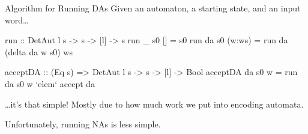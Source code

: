 \documentclass{beamer}
\begin{document}
  \begin{frame}[fragile]{Algorithm for Running DAs}
    Given an automaton, a starting state, and an input word\ldots

    \begin{code}
run :: DetAut l s -> s -> [l] -> s 
run _ s0 [] = s0 
run da s0 (w:ws) = run da (delta da w s0) ws 
 
acceptDA :: (Eq s) => DetAut l s -> s -> [l] -> Bool 
acceptDA da s0 w = run da s0 w `elem` accept da
    \end{code}\pause \vspace{1em}
    \ldots it's that simple! Mostly due to how much work we put into encoding automata. \vspace{1em} \pause

    Unfortunately, running NAs is less simple. 
    
  \end{frame}
  
\end{document}
